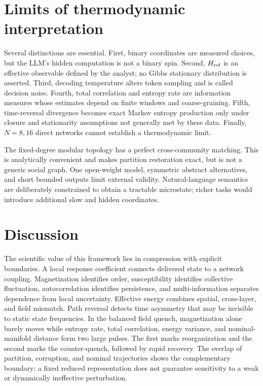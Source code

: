 \documentclass[12pt]{article}
\begin{document}
\section{Limits of thermodynamic interpretation}

Several distinctions are essential. First, binary coordinates are measured
choices, but the LLM's hidden computation is not a binary spin. Second,
$H_{\rm ref}$ is an effective observable defined by the analyst; no Gibbs
stationary distribution is asserted. Third, decoding temperature alters token
sampling and is called decision noise. Fourth, total correlation and entropy
rate are information measures whose estimates depend on finite windows and
coarse-graining. Fifth, time-reversal divergence becomes exact Markov entropy
production only under closure and stationarity assumptions not generally met
by these data. Finally, $N=8,16$ direct networks cannot establish a
thermodynamic limit.

The fixed-degree modular topology has a perfect cross-community matching. This
is analytically convenient and makes partition restoration exact, but is not a
generic social graph. One open-weight model, symmetric abstract alternatives,
and short bounded outputs limit external validity. Natural-language semantics
are deliberately constrained to obtain a tractable microstate; richer tasks
would introduce additional slow and hidden coordinates.

\section{Discussion}

The scientific value of this framework lies in compression with explicit
boundaries. A local response coefficient connects delivered state to a network
coupling. Magnetization identifies order, susceptibility identifies collective
fluctuation, autocorrelation identifies persistence, and multi-information
separates dependence from local uncertainty. Effective energy combines spatial,
cross-layer, and field mismatch. Path reversal detects time asymmetry that may
be invisible to static state frequencies. In the balanced field quench,
magnetization alone barely moves while entropy rate, total correlation, energy
variance, and nominal-manifold distance form two large pulses. The first marks
reorganization and the second marks the counter-quench, followed by rapid
recovery. The overlap of partition, corruption, and nominal trajectories shows
the complementary boundary: a fixed reduced representation does not guarantee
sensitivity to a weak or dynamically ineffective perturbation.
\end{document}

